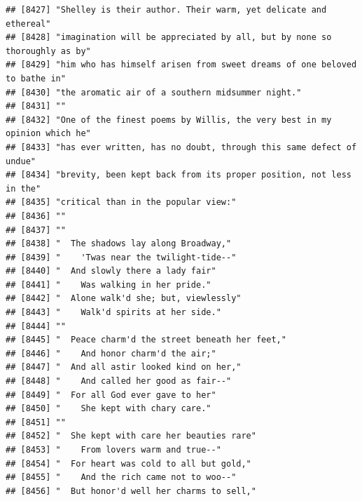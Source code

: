 \documentclass{article}\usepackage[]{graphicx}\usepackage[]{color}
\makeatletter
\newenvironment{kframe}{%
 \def\at@end@of@kframe{}%
 \ifinner\ifhmode%
  \def\at@end@of@kframe{\end{minipage}}%
  \begin{minipage}{\columnwidth}%
 \fi\fi%
 \def\FrameCommand##1{\hskip\@totalleftmargin \hskip-\fboxsep
 \colorbox{shadecolor}{##1}\hskip-\fboxsep
     \hskip-\linewidth \hskip-\@totalleftmargin \hskip\columnwidth}%
 \MakeFramed {\advance\hsize-\width
   \@totalleftmargin\z@ \linewidth\hsize
   \@setminipage}}%
 {\par\unskip\endMakeFramed%
 \at@end@of@kframe}
\newenvironment{knitrout}{}{} %
\makeatother
\begin{document}
\begin{knitrout}
\begin{kframe}
\begin{verbatim}
## [8427] "Shelley is their author. Their warm, yet delicate and ethereal"              
## [8428] "imagination will be appreciated by all, but by none so thoroughly as by"     
## [8429] "him who has himself arisen from sweet dreams of one beloved to bathe in"     
## [8430] "the aromatic air of a southern midsummer night."                             
## [8431] ""                                                                            
## [8432] "One of the finest poems by Willis, the very best in my opinion which he"     
## [8433] "has ever written, has no doubt, through this same defect of undue"           
## [8434] "brevity, been kept back from its proper position, not less in the"           
## [8435] "critical than in the popular view:"                                          
## [8436] ""                                                                            
## [8437] ""                                                                            
## [8438] "  The shadows lay along Broadway,"                                           
## [8439] "    'Twas near the twilight-tide--"                                          
## [8440] "  And slowly there a lady fair"                                              
## [8441] "    Was walking in her pride."                                               
## [8442] "  Alone walk'd she; but, viewlessly"                                         
## [8443] "    Walk'd spirits at her side."                                             
## [8444] ""                                                                            
## [8445] "  Peace charm'd the street beneath her feet,"                                
## [8446] "    And honor charm'd the air;"                                              
## [8447] "  And all astir looked kind on her,"                                         
## [8448] "    And called her good as fair--"                                           
## [8449] "  For all God ever gave to her"                                              
## [8450] "    She kept with chary care."                                               
## [8451] ""                                                                            
## [8452] "  She kept with care her beauties rare"                                      
## [8453] "    From lovers warm and true--"                                             
## [8454] "  For heart was cold to all but gold,"                                       
## [8455] "    And the rich came not to woo--"                                          
## [8456] "  But honor'd well her charms to sell,"                                      

\end{verbatim}
\end{kframe}
\end{knitrout}
\end{document}
